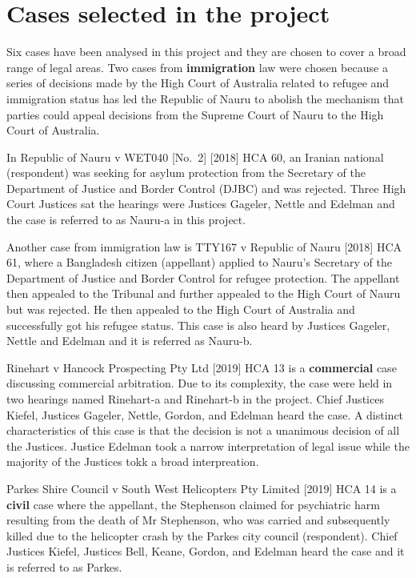 \documentclass{monashthesis}
\begin{document}
\hypertarget{cases-selected-in-the-project}{%
\section{Cases selected in the project}\label{cases-selected-in-the-project}}

Six cases have been analysed in this project and they are chosen to cover a broad range of legal areas. Two cases from \textbf{immigration} law were chosen because a series of decisions made by the High Court of Australia related to refugee and immigration status has led the Republic of Nauru to abolish the mechanism that parties could appeal decisions from the Supreme Court of Nauru to the High Court of Australia.

In Republic of Nauru v WET040 {[}No.~2{]} {[}2018{]} HCA 60, an Iranian national (respondent) was seeking for asylum protection from the Secretary of the Department of Justice and Border Control (DJBC) and was rejected. Three High Court Justices sat the hearings were Justices Gageler, Nettle and Edelman and the case is referred to as Nauru-a in this project.

Another case from immigration law is TTY167 v Republic of Nauru {[}2018{]} HCA 61, where a Bangladesh citizen (appellant) applied to Nauru's Secretary of the Department of Justice and Border Control for refugee protection. The appellant then appealed to the Tribunal and further appealed to the High Court of Nauru but was rejected. He then appealed to the High Court of Australia and successfully got his refugee status. This case is also heard by Justices Gageler, Nettle and Edelman and it is referred as Nauru-b.

Rinehart v Hancock Prospecting Pty Ltd {[}2019{]} HCA 13 is a \textbf{commercial} case discussing commercial arbitration. Due to its complexity, the case were held in two hearings named Rinehart-a and Rinehart-b in the project. Chief Justices Kiefel, Justices Gageler, Nettle, Gordon, and Edelman heard the case. A distinct characteristics of this case is that the decision is not a unanimous decision of all the Justices. Justice Edelman took a narrow interpretation of legal issue while the majority of the Justices tokk a broad interpreation.

Parkes Shire Council v South West Helicopters Pty Limited {[}2019{]} HCA 14 is a \textbf{civil} case where the appellant, the Stephenson claimed for psychiatric harm resulting from the death of Mr Stephenson, who was carried and subsequently killed due to the helicopter crash by the Parkes city council (respondent). Chief Justices Kiefel, Justices Bell, Keane, Gordon, and Edelman heard the case and it is referred to as Parkes.
\end{document}
